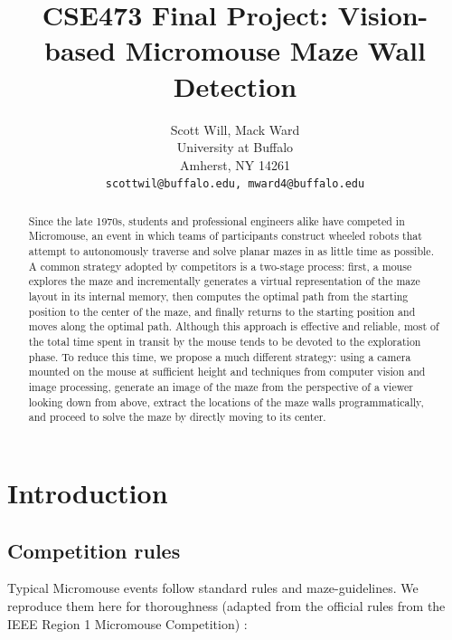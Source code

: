 \documentclass[10pt,twocolumn,letterpaper]{article}
\begin{document}
\title{CSE473 Final Project: Vision-based Micromouse Maze Wall Detection}

\author{Scott Will, Mack Ward\\
University at Buffalo\\
Amherst, NY 14261\\
{\tt\small scottwil@buffalo.edu, mward4@buffalo.edu}
}

\maketitle

\begin{abstract}
	Since the late 1970s, students and professional engineers alike have competed in Micromouse, an event in which teams
	of participants construct wheeled robots that attempt to autonomously traverse and solve planar mazes in as little
	time as possible.  A common strategy adopted by competitors is a two-stage process: first, a mouse explores the maze
	and incrementally generates a virtual representation of the maze layout in its internal memory, then computes the
	optimal path from the starting position to the center of the maze, and finally returns to the starting position and
	moves along the optimal path.  Although this approach is effective and reliable, most of the total time spent in
	transit by the mouse tends to be devoted to the exploration phase.  To reduce this time, we propose a much different
	strategy: using a camera mounted on the mouse at sufficient height and techniques from computer vision and image
	processing, generate an image of the maze from the perspective of a viewer looking down from above, extract the
	locations of the maze walls programmatically, and proceed to solve the maze by directly moving to its center.
\end{abstract}

\section{Introduction}
\label{sec:introduction}

\subsection{Competition rules}
\label{sub:rules}
Typical Micromouse events follow standard rules and maze-guidelines.  We reproduce them here for thoroughness (adapted
from the official rules from the IEEE Region 1 Micromouse Competition) \cite{micromouse}:
\end{document}
